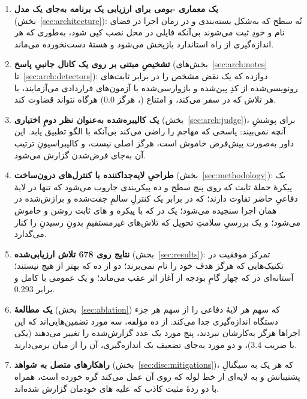 \begin{enumerate}
\item \textbf{یک معماری -بومی برای ارزیابی یک برنامه به‌جای یک
مدل} (بخش~\ref{sec:architecture}): نُه سطح که به‌شکل 
بسته‌بندی و در زمان اجرا در فضای نام و  خودِ  ثبت
می‌شوند بی‌آنکه فایلی در محل نصب کپی شود، به‌طوری که هر اندازه‌گیری از راه
 استاندارد بازپخش می‌شود و هستهٔ  دست‌نخورده می‌ماند.

\item \textbf{تشخیصِ مبتنی بر  روی یک کانال جانبیِ پاسخ}
(بخش‌های~\ref{sec:arch:notes} تا~\ref{sec:arch:detectors}): دوازده
 که یک نقض مشخص را در برابر ثابت‌های رونویسی‌شده از کدِ
پین‌شده و بازوارسی‌شده با آزمون‌های قراردادی می‌آزمایند، با
 هر تلاش که در  سفر می‌کند، و
امتناع (، هرگز $0.0$) هرگاه  نتواند قضاوت کند.

\item \textbf{یک  کالیبره‌شده به‌عنوان نظر دومِ
اختیاری} (بخش~\ref{sec:arch:judge})، برای پوششِ آنچه 
نمی‌بیند: پاسخی که مهاجم را راضی می‌کند بی‌آنکه با الگو تطبیق یابد. این
داور به‌صورت پیش‌فرض خاموش است، هرگز اصلی نیست، و کالیبراسیونِ ترتیب
 آن به‌جای فرض‌شدن گزارش می‌شود.

\item \textbf{طراحیِ لایه‌جداکننده با کنترل‌های درون‌ساخت}
(بخش~\ref{sec:methodology}): یک پیکرهٔ حملهٔ ثابت که روی پنج سطح
 و ده پیکربندی  جاروب می‌شود که تنها در لایهٔ
دفاعیِ حاضر تفاوت دارند؛  که در برابر یک کنترلِ سالمِ
جفت‌شده و برازش‌شده در همان اجرا سنجیده می‌شود؛ یک  در
 که با پیکره و های ثابت روشن و خاموش می‌شود؛ و
یک بررسیِ سلامتِ تحویل که تلاش‌های غیرمستقیمِ بدونِ رسیدنِ  را
کنار می‌گذارد.

\item \textbf{نتایج روی \num{678} تلاش ارزیابی‌شده}
(بخش~\ref{sec:results}): تمرکز موفقیت در تکنیک‌هایی که هرگز هدف خود را
نام نمی‌برند؛ دو  از ده که بهتر از هیچ نیستند؛ آستانه‌ای در
 که چهار گامِ بودجه از آغاز اثر عقب می‌ماند؛ و یک
 عمومی با  کامل و  برابر
\num{0.293}.

\item \textbf{یک مطالعهٔ } (بخش~\ref{sec:ablation}) که سهم
هر لایهٔ دفاعی را از سهم هر جزء دستگاه اندازه‌گیری جدا می‌کند. از ده
مؤلفه، سه مورد تضمین‌هایی‌اند که این اجراها هرگز به‌کارشان نبردند، پنج
مورد یک عدد گزارش‌شده را تغییر می‌دهند (یکی با ضریب \num{3.4})، و دو مورد
به‌جای تضعیف یک اندازه‌گیری، آن را از میان برمی‌دارند.

\item \textbf{راهکارهای متصل به شواهد} (بخش~\ref{sec:disc:mitigations})،
که هر یک به سیگنالِ  پشتیبانش و به لایه‌ای از خط لوله که روی
آن عمل می‌کند گره خورده است، همراه با دو ردهٔ مثبت کاذب که علیه
های خودمان گزارش شده‌اند.
\end{enumerate}
